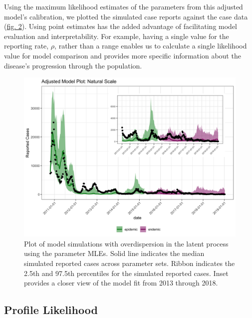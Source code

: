 \documentclass[12pt]{article}
\begin{document}
 Using the maximum likelihood estimates of the parameters from this adjusted model's calibration, we plotted the simulated case reports against the case data (\hyperref[fig:2]{fig. 2}). Using point estimates has the added advantage of facilitating model evaluation and interpretability. For example, having a single value for the reporting rate, $\rho$, rather than a range enables us to calculate a single likelihood value for model comparison and provides more specific information about the disease's progression through the population. 
        \begin{figure}[H]
          \centering
          \includegraphics[width=150mm]{adj_inset.png}
          \caption{Plot of model simulations with overdispersion in the latent process using the parameter MLEs. Solid line indicates the median simulated reported cases across parameter sets. Ribbon indicates the 2.5th and 97.5th percentiles for the simulated reported cases. Inset provides a closer view of the model fit from 2013 through 2018.}
          \label{fig:2}
        \end{figure}

\subsection{Profile Likelihood}
\end{document}
